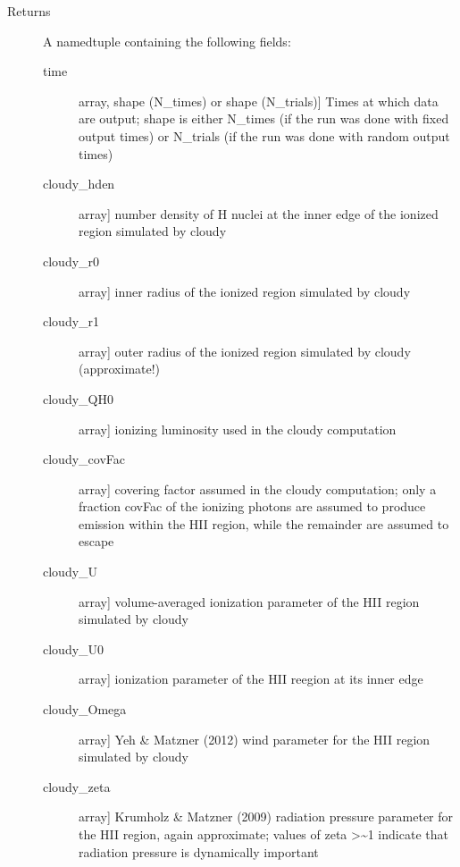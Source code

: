 \documentclass[letterpaper,10pt,english]{sphinxmanual}
\begin{document}
\begin{fulllineitems}
\begin{description}
\begin{description}
\end{description}

\item[{Returns}] \leavevmode
A namedtuple containing the following fields:
\begin{description}
\item[{time}] \leavevmode{[}array, shape (N\_times) or shape (N\_trials){]}
Times at which data are output; shape is either N\_times (if
the run was done with fixed output times) or N\_trials (if
the run was done with random output times)

\item[{cloudy\_hden}] \leavevmode{[}array{]}
number density of H nuclei at the inner edge of the ionized
region simulated by cloudy

\item[{cloudy\_r0}] \leavevmode{[}array{]}
inner radius of the ionized region simulated by cloudy

\item[{cloudy\_r1}] \leavevmode{[}array{]}
outer radius of the ionized region simulated by cloudy (approximate!)

\item[{cloudy\_QH0}] \leavevmode{[}array{]}
ionizing luminosity used in the cloudy computation

\item[{cloudy\_covFac}] \leavevmode{[}array{]}
covering factor assumed in the cloudy computation; only a
fraction covFac of the ionizing photons are assumed to
produce emission within the HII region, while the remainder
are assumed to escape

\item[{cloudy\_U}] \leavevmode{[}array{]}
volume-averaged ionization parameter of the HII region
simulated by cloudy

\item[{cloudy\_U0}] \leavevmode{[}array{]}
ionization parameter of the HII reegion at its inner edge

\item[{cloudy\_Omega}] \leavevmode{[}array{]}
Yeh \& Matzner (2012) wind parameter for the HII region
simulated by cloudy

\item[{cloudy\_zeta}] \leavevmode{[}array{]}
Krumholz \& Matzner (2009) radiation pressure parameter for
the HII region, again approximate; values of zeta \textgreater{}\textasciitilde{}1
indicate that radiation pressure is dynamically important

\end{description}


\end{description}
\end{fulllineitems}
\end{document}
